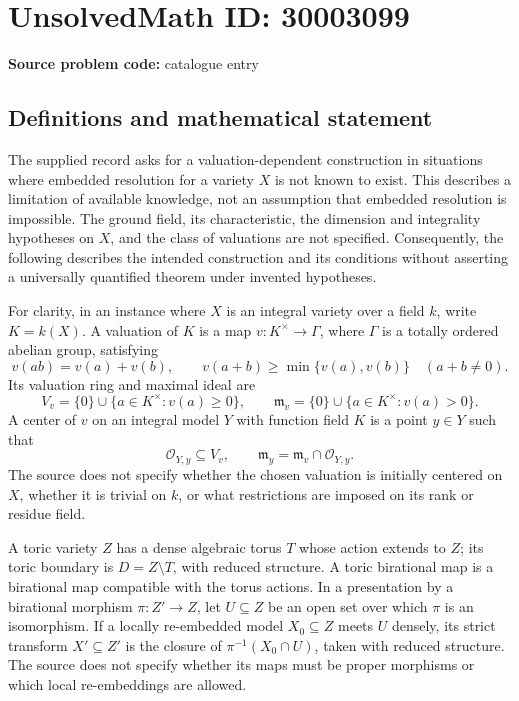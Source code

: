 \documentclass[11pt]{article}
\begin{document}
\section*{UnsolvedMath ID: 30003099}
\textbf{Source problem code:} catalogue entry
\subsection{Definitions and mathematical statement}
The supplied record asks for a valuation-dependent construction in situations where embedded resolution for a variety \(X\) is not known to exist. This describes a limitation of available knowledge, not an assumption that embedded resolution is impossible. The ground field, its characteristic, the dimension and integrality hypotheses on \(X\), and the class of valuations are not specified. Consequently, the following describes the intended construction and its conditions without asserting a universally quantified theorem under invented hypotheses.

For clarity, in an instance where \(X\) is an integral variety over a field \(k\), write \(K=k(X)\). A valuation of \(K\) is a map \(v:K^{\times}\to\Gamma\), where \(\Gamma\) is a totally ordered abelian group, satisfying
\[
v(ab)=v(a)+v(b),\qquad v(a+b)\geq\min\{v(a),v(b)\}\quad(a+b\ne0).
\]
Its valuation ring and maximal ideal are
\[
V_v=\{0\}\cup\{a\in K^{\times}:v(a)\geq0\},\qquad
\mathfrak m_v=\{0\}\cup\{a\in K^{\times}:v(a)>0\}.
\]
A center of \(v\) on an integral model \(Y\) with function field \(K\) is a point \(y\in Y\) such that
\[
\mathcal O_{Y,y}\subseteq V_v,\qquad
\mathfrak m_y=\mathfrak m_v\cap\mathcal O_{Y,y}.
\]
The source does not specify whether the chosen valuation is initially centered on \(X\), whether it is trivial on \(k\), or what restrictions are imposed on its rank or residue field.

A toric variety \(Z\) has a dense algebraic torus \(T\) whose action extends to \(Z\); its toric boundary is \(D=Z\setminus T\), with reduced structure. A toric birational map is a birational map compatible with the torus actions. In a presentation by a birational morphism \(\pi:Z'\to Z\), let \(U\subseteq Z\) be an open set over which \(\pi\) is an isomorphism. If a locally re-embedded model \(X_0\subseteq Z\) meets \(U\) densely, its strict transform \(X'\subseteq Z'\) is the closure of \(\pi^{-1}(X_0\cap U)\), taken with reduced structure. The source does not specify whether its maps must be proper morphisms or which local re-embeddings are allowed.
\end{document}

